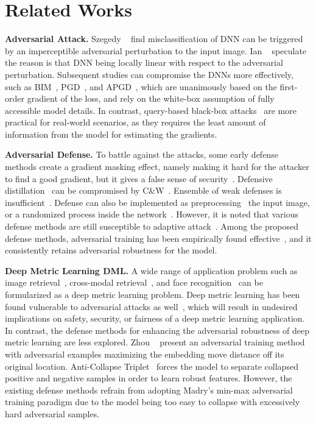 \documentclass[10pt,twocolumn,letterpaper]{article}
\begin{document}
\section{Related Works}
\label{sec:2}

\textbf{Adversarial Attack.}
%
Szegedy \etal~\cite{l-bfgs} find misclassification of DNN can be triggered by
an imperceptible adversarial perturbation to the input image.
%
Ian \etal~\cite{fgsm} speculate the reason is that DNN being locally linear
with respect to the adversarial perturbation.
%
Subsequent studies can compromise the DNNs more effectively, such as
BIM~\cite{i-fgsm}, PGD~\cite{madry}, and APGD~\cite{apgd}, which are
unanimously based on the first-order gradient of the loss, and rely on the
white-box assumption of fully accessible model details.
%
In contrast, query-based black-box attacks~\cite{nes-atk,spsa-atk} are more
practical for real-world scenarios, as they requires the least amount of
information from the model for estimating the gradients.

\textbf{Adversarial Defense.}
%
To battle against the attacks, some early defense methods create a gradient
masking effect, namely making it hard for the attacker to find a good gradient,
but it gives a false sense of security~\cite{obfuscated}.
%
Defensive distillation~\cite{distill2} can be compromised by C\&W~\cite{cw}.
%
Ensemble of weak defenses is insufficient~\cite{ensembleweak}.
%
Defense can also be implemented as preprocessing~\cite{deflecting} the input
image, or a randomized process inside the network~\cite{self-ensemble}.
%
However, it is noted that various defense methods are still susceptible to
adaptive attack~\cite{adaptive}.
%
Among the proposed defense methods, adversarial training has been empirically
found effective~\cite{bilateral,advtrain-triplet,benchmarking}, and it
consistently retains adversarial robustness for the model.

\textbf{Deep Metric Learning DML.}
%
A wide range of application problem such as image retrieval~\cite{imagesim2},
cross-modal retrieval~\cite{ladderloss}, and face recognition~\cite{facenet}
can be formularized as a deep metric learning problem.
%
Deep metric learning has been found vulnerable to adversarial attacks as
well~\cite{advrank,advorder}, which will result in undesired implications on
safety, security, or fairness of a deep metric learning application.
%
In contrast, the defense methods for enhancing the adversarial robustness of
deep metric learning are less explored.
%
Zhou \etal~\cite{advrank} present an adversarial training method with
adversarial examples maximizing the embedding move distance off its original
location.
%
Anti-Collapse Triplet~\cite{robrank} forces the model to separate collapsed
positive and negative samples in order to learn robust features.
%
However, the existing defense methods refrain from adopting Madry's min-max
adversarial training paradigm due to the model being too easy to collapse with
excessively hard adversarial samples.
\end{document}
